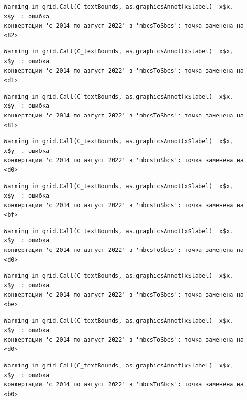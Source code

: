 \documentclass[
  letterpaper,
  DIV=11,
  numbers=noendperiod]{scrreprt}
\begin{document}
\begin{verbatim}
Warning in grid.Call(C_textBounds, as.graphicsAnnot(x$label), x$x, x$y, : ошибка
конвертации 'с 2014 по август 2022' в 'mbcsToSbcs': точка заменена на <82>
\end{verbatim}

\begin{verbatim}
Warning in grid.Call(C_textBounds, as.graphicsAnnot(x$label), x$x, x$y, : ошибка
конвертации 'с 2014 по август 2022' в 'mbcsToSbcs': точка заменена на <d1>
\end{verbatim}

\begin{verbatim}
Warning in grid.Call(C_textBounds, as.graphicsAnnot(x$label), x$x, x$y, : ошибка
конвертации 'с 2014 по август 2022' в 'mbcsToSbcs': точка заменена на <81>
\end{verbatim}

\begin{verbatim}
Warning in grid.Call(C_textBounds, as.graphicsAnnot(x$label), x$x, x$y, : ошибка
конвертации 'с 2014 по август 2022' в 'mbcsToSbcs': точка заменена на <d0>
\end{verbatim}

\begin{verbatim}
Warning in grid.Call(C_textBounds, as.graphicsAnnot(x$label), x$x, x$y, : ошибка
конвертации 'с 2014 по август 2022' в 'mbcsToSbcs': точка заменена на <bf>
\end{verbatim}

\begin{verbatim}
Warning in grid.Call(C_textBounds, as.graphicsAnnot(x$label), x$x, x$y, : ошибка
конвертации 'с 2014 по август 2022' в 'mbcsToSbcs': точка заменена на <d0>
\end{verbatim}

\begin{verbatim}
Warning in grid.Call(C_textBounds, as.graphicsAnnot(x$label), x$x, x$y, : ошибка
конвертации 'с 2014 по август 2022' в 'mbcsToSbcs': точка заменена на <be>
\end{verbatim}

\begin{verbatim}
Warning in grid.Call(C_textBounds, as.graphicsAnnot(x$label), x$x, x$y, : ошибка
конвертации 'с 2014 по август 2022' в 'mbcsToSbcs': точка заменена на <d0>
\end{verbatim}

\begin{verbatim}
Warning in grid.Call(C_textBounds, as.graphicsAnnot(x$label), x$x, x$y, : ошибка
конвертации 'с 2014 по август 2022' в 'mbcsToSbcs': точка заменена на <b0>
\end{verbatim}
\end{document}
